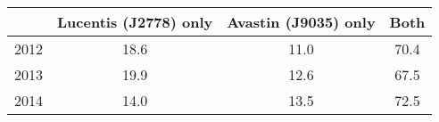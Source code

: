 \begin{tabular}{cccc}
\toprule
{} &  Lucentis (J2778) only &  Avastin (J9035) only &  Both \\
\midrule
2012 &                   18.6 &                  11.0 &  70.4 \\
2013 &                   19.9 &                  12.6 &  67.5 \\
2014 &                   14.0 &                  13.5 &  72.5 \\
\bottomrule
\end{tabular}
